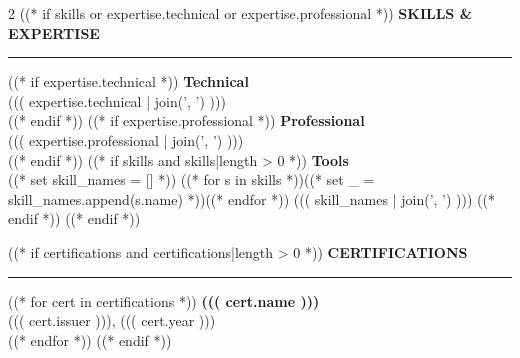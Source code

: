\documentclass[11pt,a4paper]{article}
\newcommand{\redsection}[1]{%
  \vspace{9pt}
  {\fontsize{11}{13}\selectfont\bfseries\color{deepred}\MakeUppercase{#1}}\\[-1pt]
  {\color{deepred}\rule{\linewidth}{0.5pt}}
  \vspace{6pt}
}
\begin{document}
\begin{multicols}{2}
((* if skills or expertise.technical or expertise.professional *))
\redsection{Skills \& Expertise}
((* if expertise.technical *))
{\small\bfseries\color{deepred} Technical}\\[2pt]
{\small ((( expertise.technical | join(', ') )))}\\[6pt]
((* endif *))
((* if expertise.professional *))
{\small\bfseries\color{deepred} Professional}\\[2pt]
{\small ((( expertise.professional | join(', ') )))}\\[6pt]
((* endif *))
((* if skills and skills|length > 0 *))
{\small\bfseries\color{deepred} Tools}\\[2pt]
((* set skill_names = [] *))
((* for s in skills *))((* set _ = skill_names.append(s.name) *))((* endfor *))
{\small ((( skill_names | join(', ') )))}
((* endif *))
((* endif *))

((* if certifications and certifications|length > 0 *))
\redsection{Certifications}
((* for cert in certifications *))
{\bfseries ((( cert.name )))}\\
{\small\color{muted} ((( cert.issuer ))), ((( cert.year )))}\\[6pt]
((* endfor *))
((* endif *))

\end{multicols}
\end{document}
